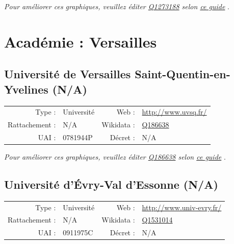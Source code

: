 \documentclass[11pt,french,landscape]{article}
\begin{document}
\textit{\scriptsize Pour améliorer ces graphiques, veuillez éditer \href{https://www.wikidata.org/entity/Q1273188}{Q1273188}  selon \href{https://github.com/cpesr/wikidataESR/blob/master/Rmd/wikidataESR.md}{ce guide}}
.


\newpage

\hypertarget{acaduxe9mie-versailles}{%
\section{Académie : Versailles}\label{acaduxe9mie-versailles}}

\hypertarget{universituxe9-de-versailles-saint-quentin-en-yvelines-na}{%
\subsection{Université de Versailles Saint-Quentin-en-Yvelines
(N/A)}\label{universituxe9-de-versailles-saint-quentin-en-yvelines-na}}

\begin{tabular*}{0.45\textwidth}{rp{2cm}rl}  
\hline  
Type : & Université & Web : &\href{http://www.uvsq.fr/}{http://www.uvsq.fr/} \\  
Rattachement : & N/A & Wikidata : & \href{https://www.wikidata.org/entity/Q186638}{Q186638} \\  
UAI : & 0781944P & Décret : & N/A \\  
\hline  
\end{tabular*}

\textit{\scriptsize Pour améliorer ces graphiques, veuillez éditer \href{https://www.wikidata.org/entity/Q186638}{Q186638}  selon \href{https://github.com/cpesr/wikidataESR/blob/master/Rmd/wikidataESR.md}{ce guide}}
.


\newpage

\hypertarget{universituxe9-duxe9vry-val-dessonne-na}{%
\subsection{Université d'Évry-Val d'Essonne
(N/A)}\label{universituxe9-duxe9vry-val-dessonne-na}}

\begin{tabular*}{0.45\textwidth}{rp{2cm}rl}  
\hline  
Type : & Université & Web : &\href{http://www.univ-evry.fr/}{http://www.univ-evry.fr/} \\  
Rattachement : & N/A & Wikidata : & \href{https://www.wikidata.org/entity/Q1531014}{Q1531014} \\  
UAI : & 0911975C & Décret : & N/A \\  
\hline  
\end{tabular*}
\end{document}

